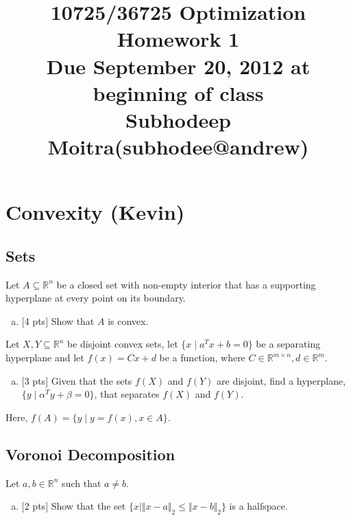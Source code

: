\documentclass[12pt]{article}
\title{10725/36725 Optimization \\Homework 1\\
{\small Due September 20, 2012 at beginning of class} \\
{Subhodeep Moitra(subhodee@andrew)}
}
\date{}
\begin{document}
\maketitle


\newpage
\clearpage

\section{Convexity (Kevin)}

\subsection{Sets}

Let $A\subseteq\mathbb{R}^n$ be a closed set with non-empty interior that has a supporting hyperplane at every point on its boundary.
\begin{enumerate}[(a)]
\item $[$4 pts$]$ 
Show that $A$ is convex.
\end{enumerate}

\vspace{.25cm}

\noindent Let $X,Y\subseteq\mathbb{R}^n$ be disjoint convex sets, let $\{x \mid a^Tx + b = 0\}$ be a separating hyperplane and let $f(x) = Cx + d$ be a function, where $C\in\mathbb{R}^{m\times n},d\in\mathbb{R}^m$.
\begin{enumerate}[(b)]
\item
$[$3 pts$]$ Given that the sets $f(X)$ and $f(Y)$ are disjoint, find a hyperplane, $\{ y \mid \alpha^Ty + \beta = 0 \}$, that separates $f(X)$ and $f(Y)$.
\end{enumerate}
Here, $f(A) = \{ y \mid y = f(x), x\in A\}$.

\subsection{Voronoi Decomposition}

Let $a,b\in\mathbb{R}^n$ such that $a\ne b$.
\begin{enumerate}[(a)]
\item
$[$2 pts$]$  Show that the set $\{ x \mid \Vert x-a \Vert_2 \le \Vert x-b \Vert_2\}$ is a halfspace.
\end{enumerate}

\vspace{.25cm} 
\end{document}
